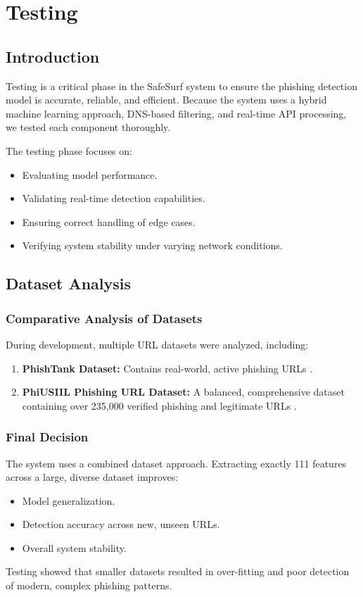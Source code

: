 \chapter{Testing}

\section{Introduction}

Testing is a critical phase in the SafeSurf system to ensure the phishing detection model is accurate, reliable, and efficient. Because the system uses a hybrid machine learning approach, DNS-based filtering, and real-time API processing, we tested each component thoroughly.

\noindent
The testing phase focuses on:
\begin{itemize}
    \item Evaluating model performance.
    \item Validating real-time detection capabilities.
    \item Ensuring correct handling of edge cases.
    \item Verifying system stability under varying network conditions.
\end{itemize}

\section{Dataset Analysis}

\subsection*{Comparative Analysis of Datasets}
\noindent
During development, multiple URL datasets were analyzed, including:
\begin{enumerate}
    \item \textbf{PhishTank Dataset:} Contains real-world, active phishing URLs \cite{ref17}.
    \item \textbf{PhiUSIIL Phishing URL Dataset:} A balanced, comprehensive dataset containing over 235,000 verified phishing and legitimate URLs \cite{ref2}.
\end{enumerate}

\subsection*{Final Decision}
\noindent
The system uses a combined dataset approach. Extracting exactly 111 features across a large, diverse dataset improves:
\begin{itemize}
    \item Model generalization.
    \item Detection accuracy across new, unseen URLs.
    \item Overall system stability.
\end{itemize}
\noindent
Testing showed that smaller datasets resulted in over-fitting and poor detection of modern, complex phishing patterns.


